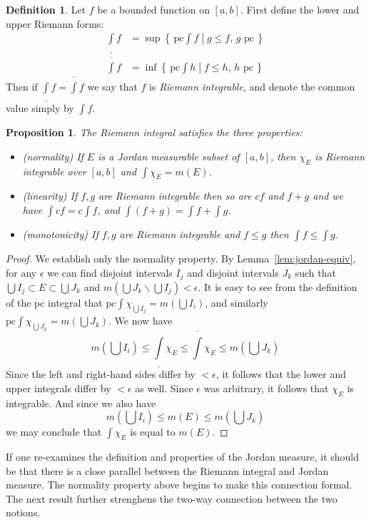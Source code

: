 \documentclass[11pt,oneside]{amsbook}
\newcommand{\set}[1]{\left\{\,#1\,\right\}}
\renewcommand{\setminus}{\smallsetminus}
\theoremstyle{definition}
\theoremstyle{plain}
\newtheorem{prop}[thm]{Proposition}
\theoremstyle{definition}
\newtheorem{defn}[thm]{Definition}
\theoremstyle{remark}
\numberwithin{equation}{section}
\numberwithin{figure}{section}
\begin{document}
\begin{defn}
  Let $f$ be a bounded function on $[a,b]$. First define the lower and upper Riemann forms:
  \begin{align*}
    \underline\int f&=\sup\set{\left.\text{pc}\!\!\int\!\! f\;\right|\;g\leq f\text{, $g$ pc}}\\
    \overline\int f&=\inf\set{\left.\text{pc}\!\!\int\!\! h\;\right|\;f\leq h\text{, $h$ pc}}
  \end{align*}
  Then if $\underline\int f=\overline\int f$ we say that $f$ is \emph{Riemann integrable}, and denote the common value simply by $\int f$.
\end{defn}

\begin{prop}
  The Riemann integral satisfies the three properties:
  \begin{itemize}
  \item (normality) If $E$ is a Jordan measurable subset of $[a,b]$, then $\chi_E$ is Riemann integrable over $[a,b]$ and $\int\chi_E=m(E)$.
  \item (linearity) If $f,g$ are Riemann integrable then so are $cf$ and $f+g$ and we have $\int cf=c\int f$, and $\int(f+g)=\int f+\int g$.
  \item (monotonicity) If $f,g$ are Riemann integrable and $f\leq g$ then $\int f\leq \int g$.
  \end{itemize}
\end{prop}

\begin{proof}
  We establish only the normality property. By Lemma~\ref{lem:jordan-equiv}, for any $\epsilon$ we can find disjoint intervals $I_j$ and disjoint intervals $J_k$ such that $\bigcup I_j\subset E\subset\bigcup J_k$ and $m(\bigcup J_k\setminus\bigcup I_j)<\epsilon$. It is easy to see from the definition of the pc integral that $\text{pc}\int\chi_{\bigcup I_j}=m(\bigcup I_i)$, and similarly $\text{pc}\int\chi_{\bigcup J_k}=m(\bigcup J_k)$. We now have
  \[m(\bigcup I_i)\leq\underline\int\chi_E\leq\overline\int\chi_E
  \leq m(\bigcup J_k)
  \]
  Since the left and right-hand sides differ by $<\epsilon$, it follows that the lower and upper integrals differ by $<\epsilon$ as well. Since $\epsilon$ was arbitrary, it follows that $\chi_E$ is integrable. And since we also have
  \[m(\bigcup I_i)\leq m(E)\leq m(\bigcup J_k)
  \]
  we may conclude that $\int\chi_E$ is equal to $m(E)$.
\end{proof}

If one re-examines the definition and properties of the Jordan measure, it should be that there is a close parallel between the Riemann integral and Jordan measure. The normality property above begins to make this connection formal. The next result further strenghens the two-way connection between the two notions.
\end{document}
